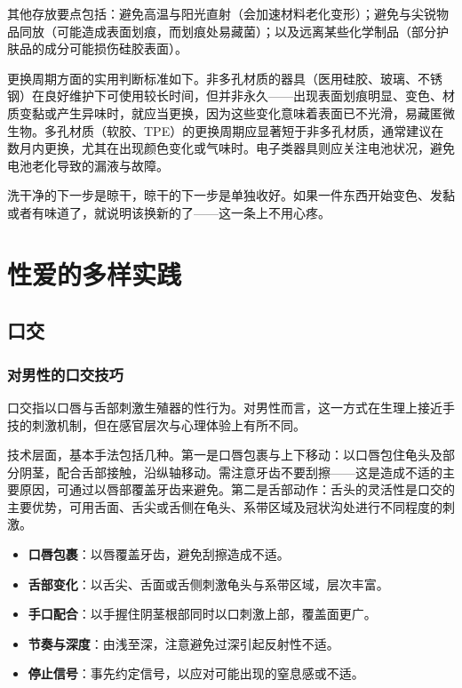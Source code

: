\documentclass[12pt,UTF8]{ctexbook}
\newcommand{\keyword}[1]{\textbf{#1}}
\begin{document}
其他存放要点包括：避免高温与阳光直射（会加速材料老化变形）；避免与尖锐物品同放（可能造成表面划痕，而划痕处易藏菌）；以及远离某些化学制品（部分护肤品的成分可能损伤硅胶表面）。

更换周期方面的实用判断标准如下。非多孔材质的器具（医用硅胶、玻璃、不锈钢）在良好维护下可使用较长时间，但并非永久——出现表面划痕明显、变色、材质变黏或产生异味时，就应当更换，因为这些变化意味着表面已不光滑，易藏匿微生物。多孔材质（软胶、TPE）的更换周期应显著短于非多孔材质，通常建议在数月内更换，尤其在出现颜色变化或气味时。电子类器具则应关注电池状况，避免电池老化导致的漏液与故障。

\begin{tcolorbox}[colback=pink!5!white,colframe=red!50!black,title=贴心小叮咛]
	洗干净的下一步是晾干，晾干的下一步是单独收好。如果一件东西开始变色、发黏或者有味道了，就说明该换新的了——这一条上不用心疼。
\end{tcolorbox}

\chapter{性爱的多样实践}


\section{口交}
\subsection{对男性的口交技巧}

口交指以口唇与舌部刺激生殖器的性行为。对男性而言，这一方式在生理上接近手技的刺激机制，但在感官层次与心理体验上有所不同。

技术层面，基本手法包括几种。第一是口唇包裹与上下移动：以口唇包住龟头及部分阴茎，配合舌部接触，沿纵轴移动。需注意牙齿不要刮擦——这是造成不适的主要原因，可通过以唇部覆盖牙齿来避免。第二是舌部动作：舌头的灵活性是口交的主要优势，可用舌面、舌尖或舌侧在龟头、系带区域及冠状沟处进行不同程度的刺激。

\begin{itemize}
	\item \keyword{口唇包裹}：以唇覆盖牙齿，避免刮擦造成不适。
	\item \keyword{舌部变化}：以舌尖、舌面或舌侧刺激龟头与系带区域，层次丰富。
	\item \keyword{手口配合}：以手握住阴茎根部同时以口刺激上部，覆盖面更广。
	\item \keyword{节奏与深度}：由浅至深，注意避免过深引起反射性不适。
	\item \keyword{停止信号}：事先约定信号，以应对可能出现的窒息感或不适。
\end{itemize}
\end{document}
